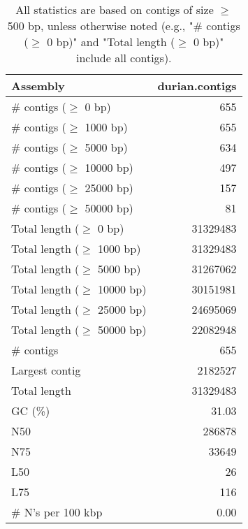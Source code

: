 \documentclass[12pt,a4paper]{article}
\begin{document}
\begin{table}[ht]
\begin{center}
\caption{All statistics are based on contigs of size $\geq$ 500 bp, unless otherwise noted (e.g., "\# contigs ($\geq$ 0 bp)" and "Total length ($\geq$ 0 bp)" include all contigs).}
\begin{tabular}{|l*{1}{|r}|}
\hline
Assembly & durian.contigs \\ \hline
\# contigs ($\geq$ 0 bp) & 655 \\ \hline
\# contigs ($\geq$ 1000 bp) & 655 \\ \hline
\# contigs ($\geq$ 5000 bp) & 634 \\ \hline
\# contigs ($\geq$ 10000 bp) & 497 \\ \hline
\# contigs ($\geq$ 25000 bp) & 157 \\ \hline
\# contigs ($\geq$ 50000 bp) & 81 \\ \hline
Total length ($\geq$ 0 bp) & 31329483 \\ \hline
Total length ($\geq$ 1000 bp) & 31329483 \\ \hline
Total length ($\geq$ 5000 bp) & 31267062 \\ \hline
Total length ($\geq$ 10000 bp) & 30151981 \\ \hline
Total length ($\geq$ 25000 bp) & 24695069 \\ \hline
Total length ($\geq$ 50000 bp) & 22082948 \\ \hline
\# contigs & 655 \\ \hline
Largest contig & 2182527 \\ \hline
Total length & 31329483 \\ \hline
GC (\%) & 31.03 \\ \hline
N50 & 286878 \\ \hline
N75 & 33649 \\ \hline
L50 & 26 \\ \hline
L75 & 116 \\ \hline
\# N's per 100 kbp & 0.00 \\ \hline
\end{tabular}
\end{center}
\end{table}
\end{document}
